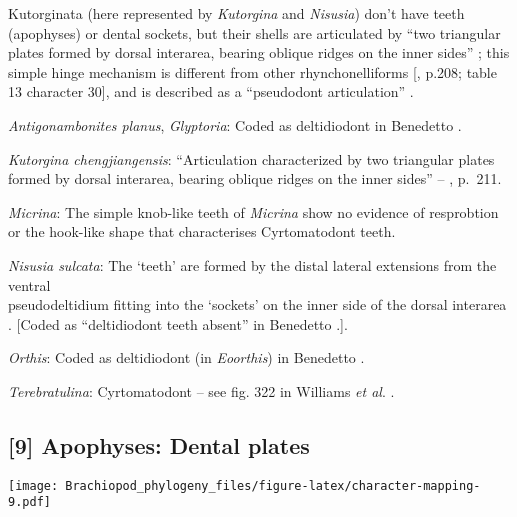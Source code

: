 \documentclass[openany]{book}
\theoremstyle{definition}
\theoremstyle{definition}
\theoremstyle{definition}
\theoremstyle{remark}
\begin{document}
Kutorginata (here represented by \emph{Kutorgina} and \emph{Nisusia})
don't have teeth (apophyses) or dental sockets, but their shells are
articulated by ``two triangular plates formed by dorsal interarea,
bearing oblique ridges on the inner sides''
\citep[p.~211]{Williams2000LinguliformeaCraniiformea}; this simple hinge
mechanism is different from other rhynchonelliforms
{[}\citet{Williams2000LinguliformeaCraniiformea}, p.208; table 13
character 30{]}, and is described as a ``pseudodont articulation''
\citep{Holmer2018Evolutionarysignificance}.

\hypertarget{Antigonambonites_planus-coding-8}{}
\emph{Antigonambonites planus}, \emph{Glyptoria}: Coded as deltidiodont
in Benedetto \citeyearpar{Benedetto2009iChaniella}.

\hypertarget{Kutorgina_chengjiangensis-coding-8}{}
\emph{Kutorgina chengjiangensis}: ``Articulation characterized by two
triangular plates formed by dorsal interarea, bearing oblique ridges on
the inner sides'' -- \citet{Williams2000LinguliformeaCraniiformea},
p.~211.

\hypertarget{Micrina-coding-8}{}
\emph{Micrina}: The simple knob-like teeth of \emph{Micrina} show no
evidence of resprobtion or the hook-like shape that characterises
Cyrtomatodont teeth.

\hypertarget{Nisusia_sulcata-coding-8}{}
\emph{Nisusia sulcata}: The `teeth' are formed by the distal lateral
extensions from the ventral\\
pseudodeltidium fitting into the `sockets' on the inner side of the
dorsal interarea \citep{Holmer2018Evolutionarysignificance}. {[}Coded as
``deltidiodont teeth absent'' in Benedetto
\citeyearpar{Benedetto2009iChaniella}.{]}.

\hypertarget{Orthis-coding-8}{}
\emph{Orthis}: Coded as deltidiodont (in \emph{Eoorthis}) in Benedetto
\citeyearpar{Benedetto2009iChaniella}.

\hypertarget{Terebratulina-coding-8}{}
\emph{Terebratulina}: Cyrtomatodont -- see fig. 322 in Williams \emph{et
al}. \citeyearpar{Williams2000LinguliformeaCraniiformea}.

\subsection*{{[}9{]} Apophyses: Dental
plates}\label{apophyses-dental-plates}

\texttt{[image: Brachiopod\_phylogeny\_files/figure-latex/character-mapping-9.pdf]}
\end{document}
